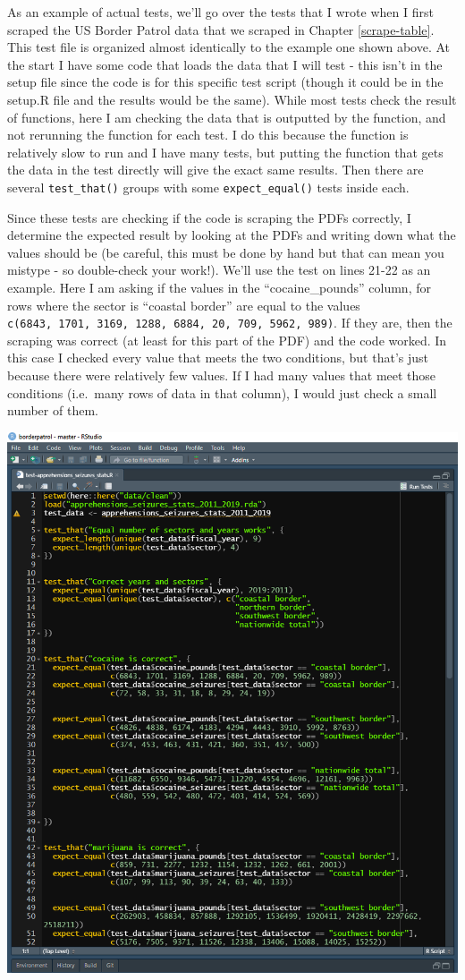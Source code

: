 \documentclass[
  12pt,
  openany]{book}
\begin{document}
As an example of actual tests, we'll go over the tests that I wrote when I first scraped the US Border Patrol data that we scraped in Chapter \ref{scrape-table}. This test file is organized almost identically to the example one shown above. At the start I have some code that loads the data that I will test - this isn't in the setup file since the code is for this specific test script (though it could be in the setup.R file and the results would be the same). While most tests check the result of functions, here I am checking the data that is outputted by the function, and not rerunning the function for each test. I do this because the function is relatively slow to run and I have many tests, but putting the function that gets the data in the test directly will give the exact same results. Then there are several \texttt{test\_that()} groups with some \texttt{expect\_equal()} tests inside each.

Since these tests are checking if the code is scraping the PDFs correctly, I determine the expected result by looking at the PDFs and writing down what the values should be (be careful, this must be done by hand but that can mean you mistype - so double-check your work!). We'll use the test on lines 21-22 as an example. Here I am asking if the values in the ``cocaine\_pounds'' column, for rows where the sector is ``coastal border'' are equal to the values \texttt{c(6843,\ 1701,\ 3169,\ 1288,\ 6884,\ 20,\ 709,\ 5962,\ 989)}. If they are, then the scraping was correct (at least for this part of the PDF) and the code worked. In this case I checked every value that meets the two conditions, but that's just because there were relatively few values. If I had many values that meet those conditions (i.e.~many rows of data in that column), I would just check a small number of them.

\includegraphics{images/test_example.PNG}
\end{document}
